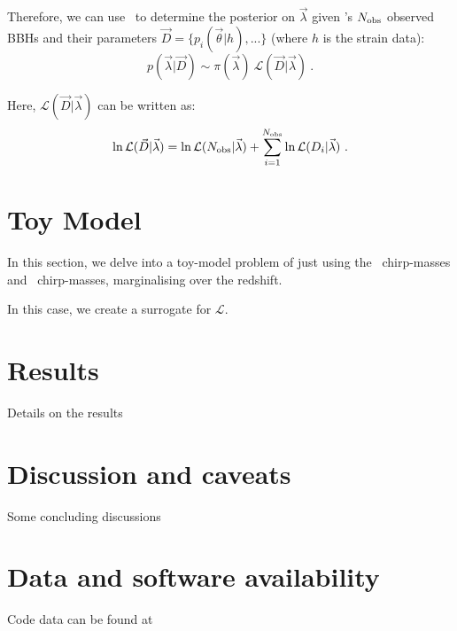 \documentclass[floatfix,ApJL,twocolumn]{aastex631}
\begin{document}
Therefore, we can use \compas\ to determine the posterior on $\vec{\lambda}$ given \lvk's $N_{\rm obs}$ observed BBHs and their parameters $\vec{D} = \{ p_i(\vec{\theta}|h), ...\}$ (where $h$ is the strain data):
\begin{equation}
    p(\vec{\lambda}| \vec{D}) \sim \pi(\vec{\lambda})\ \mathcal{L}(\vec{D}| \vec{\lambda})\ .
\end{equation}


Here, $\mathcal{L}(\vec{D}| \vec{\lambda})$ can be written as:
\begin{equation}
    \ln \mathcal{L}(\vec{D}| \vec{\lambda}) = \ln \mathcal{L}(N_{\rm obs}|\vec{\lambda}) + \sum^{N_{\rm obs}}_{i=1} \ln \mathcal{L}(D_i|\vec{\lambda}) \ .
\end{equation}







\section{Toy Model}

In this section, we delve into a toy-model problem of just using the \lvk\ chirp-masses and \compas\ chirp-masses, marginalising over the redshift. 

In this case, we create a surrogate for $\mathcal{L}$.





\section{Results}\label{sec:results}
Details on the results

\section{Discussion and caveats}\label{sec:conclusion}
Some concluding discussions

\section{Data and software availability}\label{sec:data}
Code data can be found at \projectGit



\end{document}
